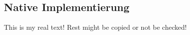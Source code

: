 \subsection{Native Implementierung} \label{subsection:counter-modifications-dynamic}
This is my real text! Rest might be copied or not be checked!
